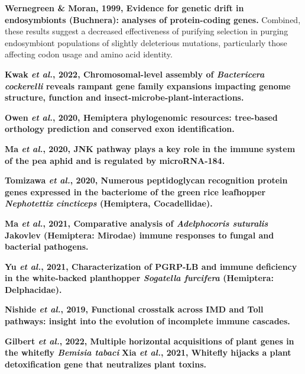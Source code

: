 \documentclass[11pt]{article}
\begin{document}
\begin{sloppypar}
\par
\textbf{Wernegreen & Moran, 1999, Evidence for genetic drift in endosymbionts (Buchnera): analyses of protein-coding genes.} \newline
Combined, these results suggest a decreased effectiveness of purifying selection in purging endosymbiont populations of slightly deleterious mutations, particularly those affecting codon usage and amino acid identity.
\par
\textbf{Kwak \textit{et al.}, 2022, Chromosomal-level assembly of \textit{Bactericera cockerelli} reveals rampant gene family expansions impacting genome structure, function and insect-microbe-plant-interactions.} \newline
\par
\textbf{Owen \textit{et al.}, 2020, Hemiptera phylogenomic resources: tree-based orthology prediction and conserved exon identification.} \newline
\par
\textbf{Ma \textit{et al.}, 2020, JNK pathway plays a key role in the immune system of the pea aphid and is regulated by microRNA-184.} \newline
\par
\textbf{Tomizawa \textit{et al.}, 2020, Numerous peptidoglycan recognition protein genes expressed in the bacteriome of the green rice leafhopper \textit{Nephotettix cincticeps} (Hemiptera, Cocadellidae).} \newline
\par
\textbf{Ma \textit{et al.}, 2021, Comparative analysis of \textit{Adelphocoris suturalis} Jakovlev (Hemiptera: Mirodae) immune responses to fungal and bacterial pathogens.} \newline
\par
\textbf{Yu \textit{et al.}, 2021, Characterization of PGRP-LB and immune deficiency in the white-backed planthopper \textit{Sogatella furcifera} (Hemiptera: Delphacidae).} \newline
\par
\textbf{Nishide \textit{et al.}, 2019, Functional crosstalk across IMD and Toll pathways: insight into the evolution of incomplete immune cascades.}
\par
\textbf{Gilbert \textit{et al.}, 2022, Multiple horizontal acquisitions of plant genes in the whitefly \textit{Bemisia tabaci}} \newline
\textbf{Xia \textit{et al.}, 2021, Whitefly hijacks a plant detoxification gene that neutralizes plant toxins.} \newline

\end{sloppypar}
\end{document}
